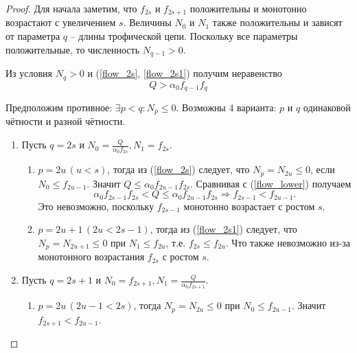         \begin{proof}
            Для начала заметим, что \(f_{2s}\) и \(f_{2s+1}\) положительны и монотонно возрастают с увеличением \(s\). Величины \(N_0\) и \(N_1\) также положительны и зависят от параметра \(q\) -- длины трофической цепи.  
            Поскольку все параметры положительные, то численность \( N_{q-1} > 0 \).

            Из условия \( N_q > 0 \) и (\ref{flow_2s}, \ref{flow_2s1}) получим неравенство
            \begin{equation} \label{flow_lower}
                Q > \alpha_0 f_{q-1} f_{q}
            \end{equation} 

            Предположим противное: \(\exists p < q : N_p \leq 0\). Возможны 4 варианта: \(p\) и \(q\) одинаковой чётности и разной чётности.

            \begin{enumerate}
                \item Пусть \(q = 2s \) и \( N_0 = \frac{Q}{\alpha_0 f_{2s}}, N_1 = f_{2s}\).
                \begin{enumerate}
                    \item \(p = 2u \, (u < s)\), тогда из (\ref{flow_2s}) следует, что \( N_p = N_{2u} \leq 0 \), если \(N_0 \leq f_{2u-1}\). Значит \(Q \leq \alpha_0 f_{2u-1} f_{2s} \). Сравнивая с (\ref{flow_lower}) получаем
                    \begin{equation*}
                        \alpha_0 f_{2s-1} f_{2s} < Q \leq \alpha_0 f_{2u-1} f_{2s} \Rightarrow f_{2s-1} < f_{2u-1}.
                    \end{equation*}
                    Это невозможно, поскольку \(f_{2s-1}\) монотонно возрастает с ростом \(s\).

                    \item \(p = 2u+1 \, (2u < 2s-1)\), тогда из (\ref{flow_2s1}) следует, что \( N_p = N_{2u+1} \leq 0 \) при \(N_1 \leq f_{2u}\), т.е. \(f_{2s} \leq f_{2u} \). Что также невозможно из-за монотонного возрастания \(f_{2s}\) с ростом \(s\). 
                \end{enumerate}

                \item Пусть \( q = 2s+1 \) и \( N_0 = f_{2s+1}, N_1 = \frac{Q}{\alpha_0 f_{2s+1}}\).
                \begin{enumerate}
                    \item \(p = 2u \, (2u-1 < 2s)\), тогда \( N_p = N_{2u} \leq 0 \) при \(N_0 \leq f_{2u-1}\). Значит \(f_{2s+1} < f_{2u-1} \). 
                    

\end{enumerate}
\end{enumerate}
\end{proof}
